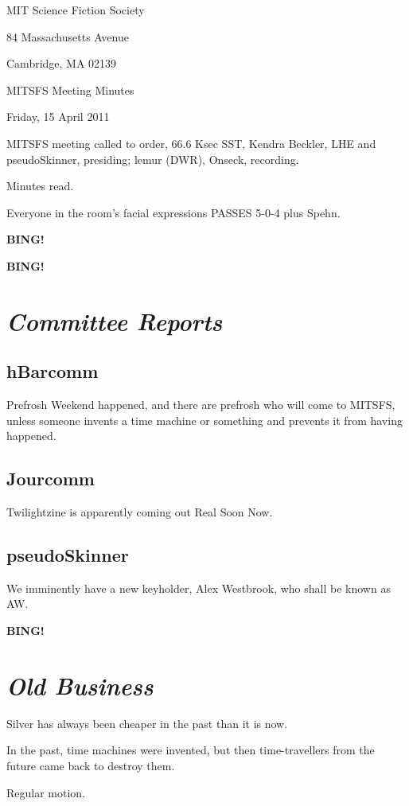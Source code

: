 \documentclass[10pt]{article}
\newcommand{\bing}{{\bf BING!} }
\newcommand{\goto}[1]{\bing \vskip 12pt \section*{{\em{#1}}}}
\newcommand{\ps}{ plus Spehn\xspace}
\newcommand{\skinner}{Kendra Beckler, LHE and pseudoSkinner}
\newcommand{\onseck}{lemur (DWR), Onseck}
\newcommand{\meetingdate}{Friday, 15 April 2011}
\begin{document}
\begin{center}

MIT Science Fiction Society

84 Massachusetts Avenue

Cambridge, MA 02139

\vspace{12pt}

MITSFS Meeting Minutes

\meetingdate

\end{center}

\vspace{18pt}

\setlength{\parskip}{6pt}

\noindent
MITSFS meeting called to order, 66.6 Ksec SST,
\skinner, presiding; \onseck, recording.

Minutes read.

Everyone in the room's facial expressions PASSES 5-0-4\ps.

\bing

\goto{Committee Reports}

\subsection*{hBarcomm}

Prefrosh Weekend happened, and there are prefrosh who will come to
MITSFS, unless someone invents a time machine or something and
prevents it from having happened.


\subsection*{Jourcomm}

Twilightzine is apparently coming out Real Soon Now.


\subsection*{pseudoSkinner}

We imminently have a new keyholder, Alex Westbrook, who shall be
known as AW.


\goto{Old Business}

Silver has always been cheaper in the past than it is now.

In the past, time machines were invented, but then time-travellers from
the future came back to destroy them.

Regular motion.
\end{document}
